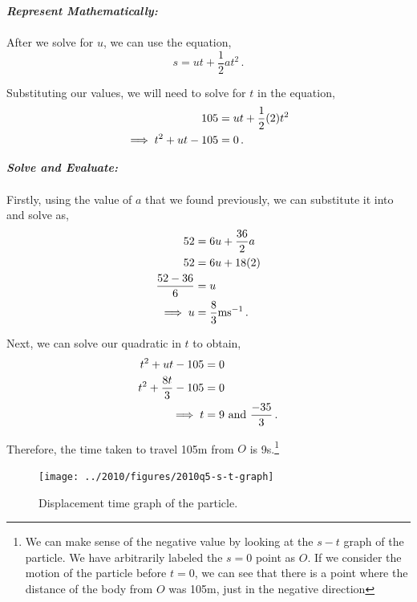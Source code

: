 \begin{subquestions}
\begin{subsubquestions}
\textbf{\textit{Represent Mathematically:}} \\ \\
After we solve for $u$, we can use the equation,
\begin{equation}
	s=ut+\frac{1}{2}at^2 \,.
\end{equation}

Substituting our values, we will need to solve for $t$ in the equation,
\begin{align}
	105 & = ut+\frac{1}{2}(2)t^2 \nonumber \\
		\implies t^2 +ut -105 & = 0 \,.
\end{align}




\textbf{\textit{Solve and Evaluate:}} \\ \\
Firstly, using the value of $a$ that we found previously, we can substitute it into  and solve as,
\begin{align}
	52 & = 6u + \frac{36}{2}a \nonumber \\
	52 & = 6u + 18(2) \nonumber \\ 
	\frac{52-36}{6} & = u \nonumber \\
	\implies u & = \frac{8}{3}\text{ms}^{-1} \,.
\end{align}

Next, we can solve our quadratic in $t$ to obtain,
\begin{align}
	t^2 +ut -105 & = 0 \nonumber \\
	t^2 +\frac{8t}{3} -105 & = 0 \nonumber \\
	\implies t & = 9 ~\text{and}~\frac{-35}{3} \,.
\end{align}

Therefore, the time taken to travel 105m from $O$ is 9s.\footnote{We can make sense of the negative value by looking at the $s-t$ graph of the particle. We have arbitrarily labeled the $s=0$ point as $O$. If we consider the motion of the particle before $t=0$, we can see that there is a point where the distance of the body from $O$ was 105m, just in the negative direction}
\begin{figure}[H]
	\begin{center}
		\texttt{[image: ../2010/figures/2010q5-s-t-graph]}
		\caption{\label{2010:q5:stGraph} Displacement time graph of the particle.}
	\end{center}
\end{figure}



\end{subsubquestions}
	

\end{subquestions}
